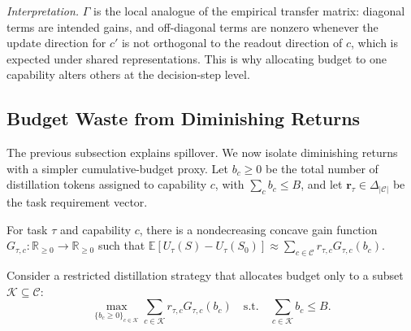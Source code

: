 \noindent\textit{Interpretation.}
$\Gamma$ is the local analogue of the empirical transfer matrix: diagonal
terms are intended gains, and off-diagonal terms are nonzero whenever the update
direction for $c'$ is not orthogonal to the readout direction of $c$, which is
expected under shared representations. This is why allocating budget to one
capability alters others at the decision-step level.

\subsection{Budget Waste from Diminishing Returns}
\label{subsec:theory_diminish_short}

The previous subsection explains spillover. We now isolate diminishing returns with a simpler cumulative-budget proxy. Let $b_c\ge0$ be the total number of distillation tokens assigned to capability $c$, with $\sum_c b_c\le B$, and let $\mathbf{r}_\tau\in\Delta_{|\mathcal{C}|}$ be the task requirement vector.

\begin{assumption}
\label{assump:concave_gains_short}
For task $\tau$ and capability $c$, there is a nondecreasing concave gain function $G_{\tau,c}:\mathbb{R}_{\ge0}\to\mathbb{R}_{\ge0}$ such that $\mathbb{E}[U_\tau(S)-U_\tau(S_0)]
\approx
\sum_{c\in\mathcal{C}} r_{\tau,c}G_{\tau,c}(b_c)$.
\end{assumption}

Consider a restricted distillation strategy that allocates budget only to a subset $\mathcal{K}\subseteq\mathcal{C}$:
\begin{equation}
\max_{\{b_c\ge0\}_{c\in\mathcal{K}}}
\sum_{c\in\mathcal{K}} r_{\tau,c}G_{\tau,c}(b_c)
\quad\mathrm{s.t.}\quad
\sum_{c\in\mathcal{K}} b_c\le B.
\label{eq:alloc_proxy_subset}
\end{equation}

